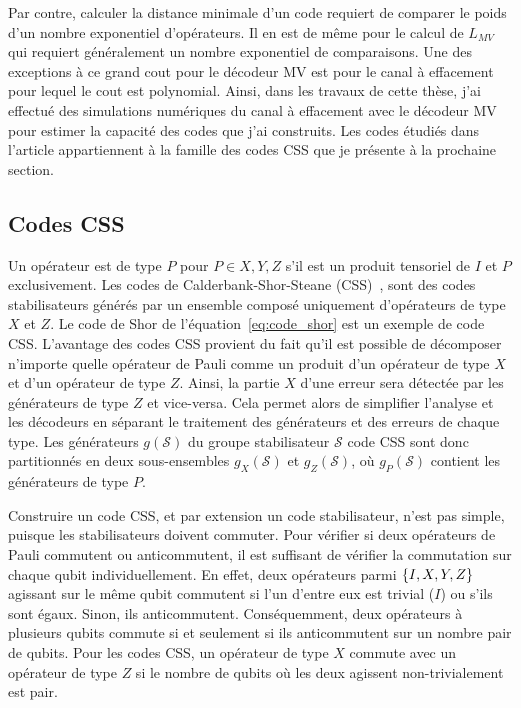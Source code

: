 Par contre,
calculer la distance minimale d'un code requiert de comparer le poids d'un nombre exponentiel d'opérateurs.
Il en est de même pour le calcul de $L_{MV}$ qui requiert généralement un nombre exponentiel de comparaisons.
Une des exceptions à ce grand cout pour le décodeur MV est pour le canal à effacement pour lequel
le cout est  polynomial.
Ainsi, dans les travaux de cette thèse,
j'ai effectué des simulations numériques du canal à effacement avec le décodeur MV pour estimer la
capacité des codes que j'ai construits.
Les codes étudiés dans l'article appartiennent 
à la famille des codes CSS que je présente à la prochaine section.

\subsection{Codes CSS}

Un opérateur est de type $P$ pour $P \in {X, Y, Z}$ s'il est un produit tensoriel de $I$ et $P$ exclusivement.
Les codes de Calderbank-Shor-Steane (CSS)~\cite{calderbank_good_1996, steane_multiple-particle_nodate},
sont des codes stabilisateurs générés par un ensemble composé uniquement d'opérateurs de type $X$ et $Z$.
Le code de Shor de l'équation~\ref{eq:code_shor} est un exemple de code CSS.
L'avantage des codes CSS provient du fait qu'il est possible de décomposer n'importe quelle opérateur
de Pauli comme un produit d'un opérateur de type $X$ et d'un opérateur de type $Z$.
Ainsi,
la partie $X$ d'une erreur sera détectée par les générateurs de type $Z$ et vice-versa.
Cela permet alors de simplifier l'analyse et les décodeurs en séparant le traitement des générateurs 
et des erreurs de chaque type.
Les générateurs $g(\mathcal S)$ du groupe stabilisateur $\mathcal S$
code CSS sont donc partitionnés en deux sous-ensembles $g_X(\mathcal S)$ et $g_Z(\mathcal S)$,
où $g_P(\mathcal S)$ contient les générateurs de type $P$.

Construire un code CSS, et par extension un code stabilisateur, n'est pas simple,
puisque les stabilisateurs doivent commuter.
Pour vérifier si deux opérateurs de Pauli commutent ou anticommutent,
il est suffisant de vérifier la commutation sur chaque qubit individuellement.
En effet,
deux opérateurs parmi $\qty{I, X, Y, Z}$ agissant sur le même qubit commutent si l'un d'entre 
eux est trivial ($I$) ou s'ils sont égaux.
Sinon, ils anticommutent.
Conséquemment,
deux opérateurs à plusieurs qubits commute si et seulement si ils anticommutent sur un nombre 
pair de qubits.
Pour les codes CSS, 
un opérateur de type $X$ commute avec un opérateur de type $Z$ si le nombre de qubits où les deux
agissent non-trivialement est pair.

